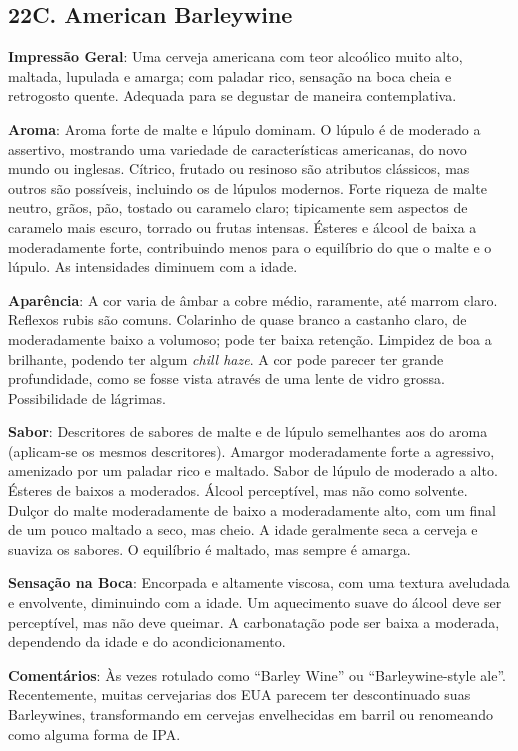 \subsection*{22C. American Barleywine}
\textbf{Impressão Geral}: Uma cerveja americana com teor alcoólico muito alto, maltada, lupulada e amarga; com paladar rico, sensação na boca cheia e retrogosto quente. Adequada para se degustar de maneira contemplativa.

\textbf{Aroma}: Aroma forte de malte e lúpulo dominam. O lúpulo é de moderado a assertivo, mostrando uma variedade de características americanas, do novo mundo ou inglesas. Cítrico, frutado ou resinoso são atributos clássicos, mas outros são possíveis, incluindo os de lúpulos modernos. Forte riqueza de malte neutro, grãos, pão, tostado ou caramelo claro; tipicamente sem aspectos de caramelo mais escuro, torrado ou frutas intensas. Ésteres e álcool de baixa a moderadamente forte, contribuindo menos para o equilíbrio do que o malte e o lúpulo. As intensidades diminuem com a idade.

\textbf{Aparência}: A cor varia de âmbar a cobre médio, raramente, até marrom claro. Reflexos rubis são comuns. Colarinho de quase branco a castanho claro, de moderadamente baixo a volumoso; pode ter baixa retenção. Limpidez de boa a brilhante, podendo ter algum \textit{chill haze}. A cor pode parecer ter grande profundidade, como se fosse vista através de uma lente de vidro grossa. Possibilidade de lágrimas.

\textbf{Sabor}: Descritores de sabores de malte e de lúpulo semelhantes aos do aroma (aplicam-se os mesmos descritores). Amargor moderadamente forte a agressivo, amenizado por um paladar rico e maltado. Sabor de lúpulo de moderado a alto. Ésteres de baixos a moderados. Álcool perceptível, mas não como solvente. Dulçor do malte moderadamente de baixo a moderadamente alto, com um final de um pouco maltado a seco, mas cheio. A idade geralmente seca a cerveja e suaviza os sabores. O equilíbrio é maltado, mas sempre é amarga.

\textbf{Sensação na Boca}: Encorpada e altamente viscosa, com uma textura aveludada e envolvente, diminuindo com a idade. Um aquecimento suave do álcool deve ser perceptível, mas não deve queimar. A carbonatação pode ser baixa a moderada, dependendo da idade e do acondicionamento.

\textbf{Comentários}: Às vezes rotulado como “Barley Wine” ou “Barleywine-style ale”. Recentemente, muitas cervejarias dos EUA parecem ter descontinuado suas Barleywines, transformando em cervejas envelhecidas em barril ou renomeando como alguma forma de IPA.

